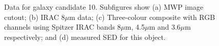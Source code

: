 \documentclass[times,usenatbib]{mn2e}
\begin{document}
\begin{figure}
\begin{center}
\caption{Data for galaxy candidate 10. Subfigures show (a) MWP image cutout; (b) IRAC 8$\mu$m data; (c) Three-colour composite with RGB channels using Spitzer IRAC bands 8$\mu$m, 4.5$\mu$m and 3.6$\mu$m respectively; and (d) measured SED for this object.}
\label{gal10}
\end{center}
\end{figure} 
\end{document}
